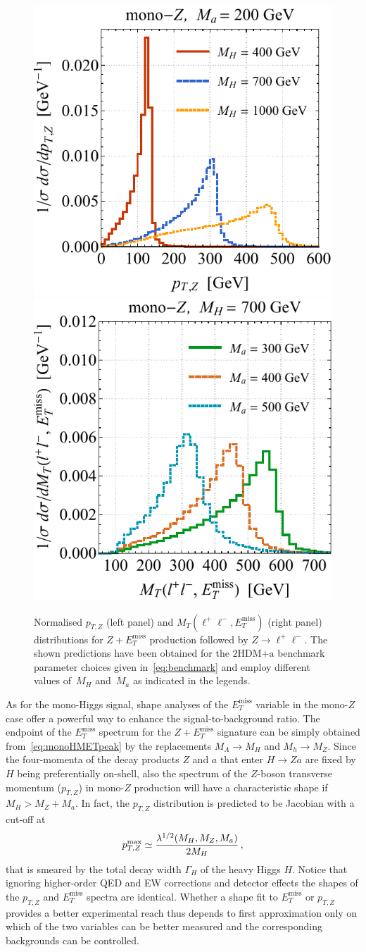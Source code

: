 \documentclass[a4paper, 11pt,notoc]{article}
\newcommand{\MET}{\ensuremath{E_T^\mathrm{miss}}\xspace}
\newcommand{\hdma}{\ensuremath{\textrm{2HDM+a}}\xspace}
\begin{document}
\begin{figure}[t!]
\centering
\includegraphics[height=0.45\textwidth]{ptzspec.pdf}	\qquad 
\includegraphics[height=0.45\textwidth]{mtspec.pdf}
\vspace{2mm}
\caption{\label{fig:zptmt} Normalised $p_{T,Z}$ (left panel) and $M_T (\ell^+ \ell^-, \MET)$ (right panel) distributions for $Z + \MET$ production followed by $Z \to \ell^+ \ell^-$. The shown predictions have been obtained for the \hdma benchmark parameter choices  given in~\eqref{eq:benchmark} and employ different values of~$M_H$ and~$M_a$ as indicated in the legends.}
\end{figure}

As for the mono-Higgs signal, shape analyses of the $\MET$ variable in the mono-$Z$ case  offer a powerful way to enhance the signal-to-background ratio. The endpoint of the $\MET$ spectrum for the $Z+\MET$ signature can be simply obtained from~\eqref{eq:monoHMETpeak} by the replacements $M_A \to M_H$ and $M_h \to M_Z$.  Since the four-momenta of the decay products $Z$ and $a$ that enter $H \to Za$ are fixed by $H$ being preferentially on-shell, also the spectrum of the $Z$-boson transverse momentum ($p_{T,Z}$) in mono-$Z$ production will have a characteristic shape if $M_H > M_Z + M_a$.   In fact,  the $p_{T,Z}$ distribution is predicted  to be Jacobian with a cut-off at~\cite{No:2015xqa,Bauer:2017ota}
\begin{equation} \label{eq:monoZpTpeak}
p_{T,Z}^{ {\rm max} } \simeq \frac{\lambda^{1/2}(M_H, M_Z, M_a)}{2 M_H}\,,
\end{equation}
that is smeared by the total decay width $\Gamma_H$ of the heavy Higgs $H$. Notice that  ignoring higher-order QED and EW corrections and detector effects the shapes of the $p_{T,Z}$ and $\MET$ spectra are identical. Whether a shape fit to $\MET$ or $p_{T,Z}$ provides a better experimental reach thus depends to first approximation only on which of the two variables can be better measured and the corresponding backgrounds can be controlled.
\end{document}
